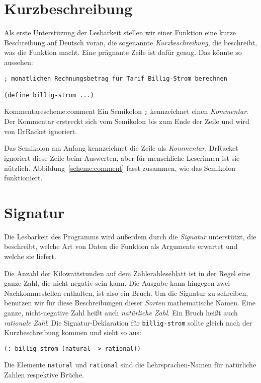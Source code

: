 \section{Kurzbeschreibung}

Als erste Unterstüzung der Lesbarkeit stellen wir einer Funktion eine
kurze Beschreibung auf Deutsch voran, die
sogenannte \textit{Kurzbeschreibung}, die
beschreibt, was die Funktion macht.  Eine prägnante Zeile ist dafür
genug.  Das könnte so aussehen:
%
\begin{lstlisting}
; monatlichen Rechnungsbetrag für Tarif Billig-Strom berechnen

(define billig-strom ...)
\end{lstlisting}
%
\begin{feature}{Kommentare}{scheme:comment}
  Ein Semikolon \lstinline{;} kennzeichnet einen 
  \textit{Kommentar}.  Der Kommentar erstreckt sich
  vom Semikolon bis zum Ende der Zeile und wird von DrRacket
  ignoriert.
\end{feature}
%
Das Semikolon am Anfang kennzeichnet die Zeile als
\textit{Kommentar}. DrRacket ignoriert diese Zeile
beim Auswerten, aber für menschliche Leserinnen ist sie nützlich.
Abbildung~\ref{scheme:comment} fasst zusammen, wie das Semikolon
funktioniert.

\section{Signatur}

Die Lesbarkeit des Programms wird außerdem durch die
\textit{Signatur} unterstützt, die
beschreibt, welche Art von Daten die Funktion als Argumente erwartet und welche sie liefert.

Die Anzahl der Kilowattstunden auf dem Zählerableseblatt ist in der
Regel eine ganze Zahl, die nicht negativ sein kann.  Die Ausgabe kann
hingegen zwei Nachkommestellen enthalten, ist also ein Bruch.  Um die
Signatur zu schreiben, benutzen wir für diese Beschreibungen dieser
\textit{Sorten} mathematische Namen.  Eine ganze,
nicht-negative Zahl heißt auch \textit{natürliche
  Zahl}.  Ein Bruch heißt auch
\textit{rationale Zahl}.  Die
Signatur-Deklaration für \lstinline{billig-strom} sollte gleich nach der
Kurzbeschreibung kommen und sieht so aus:
%
\begin{lstlisting}
(: billig-strom (natural -> rational))
\end{lstlisting}
%
Die Elemente \lstinline{natural} und \lstinline{rational} sind die
Lehrsprachen-Namen für natürliche Zahlen respektive Brüche.

